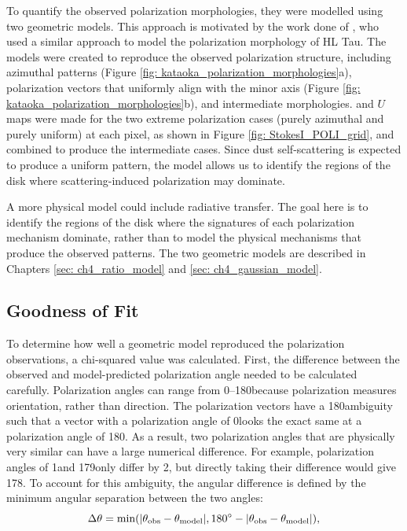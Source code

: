 To quantify the observed polarization morphologies, they were modelled using two geometric models. This approach is motivated by the work done of \cite{Stephens_2017}, who used a similar approach to model the polarization morphology of HL Tau. The models were created to reproduce the observed polarization structure, including azimuthal patterns (Figure \ref{fig: kataoka_polarization_morphologies}a), polarization vectors that uniformly align with the minor axis (Figure \ref{fig: kataoka_polarization_morphologies}b), and intermediate morphologies. \SQ and $U$ maps were made for the two extreme polarization cases (purely azimuthal and purely uniform) at each pixel, as shown in Figure \ref{fig: StokesI_POLI_grid}, and combined to produce the intermediate cases. Since dust self-scattering is expected to produce a uniform pattern, the model allows us to identify the regions of the disk where scattering-induced polarization may dominate. 

A more physical model could include radiative transfer. The goal here is to identify the regions of the disk where the signatures of each polarization mechanism dominate, rather than to model the physical mechanisms that produce the observed patterns. The two geometric models are described in Chapters \ref{sec: ch4_ratio_model} and \ref{sec: ch4_gaussian_model}.


\subsection{Goodness of Fit}

To determine how well a geometric model reproduced the polarization observations, a chi-squared value was calculated. First, the difference between the observed and model-predicted polarization angle needed to be calculated carefully. Polarization angles can range from 0--180\degg because polarization measures orientation, rather than direction. The polarization vectors have a 180\degg ambiguity such that a vector with a polarization angle of 0\degg looks the exact same at a polarization angle of 180\deggNS. As a result, two polarization angles that are physically very similar can have a large numerical difference. For example, polarization angles of 1\degg and 179\degg only differ by 2\deggNS, but directly taking their difference would give 178\deggNS. To account for this ambiguity, the angular difference is defined by the minimum angular separation between the two angles:
\begin{equation}
    \Delta \theta = \text{min}(|\theta_{\text{obs}} - \theta_{\text{model}}|, 180^\circ - |\theta_{\text{obs}} - \theta_{\text{model}}|),
    \label{eq: minimum_separation}
\end{equation}

